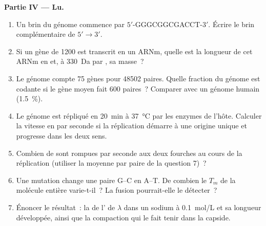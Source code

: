 \begin{problem}
\medskip
\noindent\textbf{Partie IV --- Lu.}
\begin{enumerate}[resume]
  \item Un brin du génome commence par $5'$-GGGCGGCGACCT-$3'$. Écrire le
        brin complémentaire de $5' \to 3'$.
  \item Si un gène de \num{1200}  est transcrit en un
        ARNm, quelle est la longueur de cet ARNm en  et, à
        \qty{330}{Da} par , sa masse~?
  \item Le génome compte \qty{75}{} gènes pour \num{48502} paires.
        Quelle fraction du génome est codante si le gène moyen fait
        \num{600} paires~? Comparer avec un génome humain
        (\qty{1.5}{\%}).
  \item Le génome est répliqué en \qty{20}{min} à \qty{37}{\celsius} par
        les enzymes de l'hôte. Calculer la vitesse en 
        par seconde si la réplication démarre à une origine unique et
        progresse dans les deux sens.
  \item Combien de  sont rompues par seconde aux deux
        fourches au cours de la réplication (utiliser la moyenne par
        paire de la question 7)~?
  \item Une mutation change une paire G--C en A--T. De combien le $T_m$
        de la molécule entière varie-t-il~? La fusion pourrait-elle le
        détecter~?
  \item Énoncer le résultat~: la  de l' de
        $\lambda$ dans un sodium à \qty{0.1}{mol/L} et sa longueur
        développée, ainsi que la compaction qui le fait tenir dans la
        capside.
\end{enumerate}
\end{problem}
